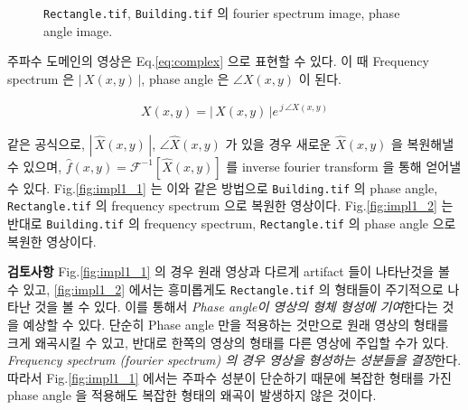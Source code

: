 \documentclass[a4paper, 12p]{paper}
\def\code#1{\texttt{#1}}
\begin{document}
\begin{figure}[H]
{}
\caption{\code{Rectangle.tif}, \code{Building.tif} 의 fourier spectrum image, phase angle image.}\label{fig:impl1_spectrum}
\end{figure}

주파수 도메인의 영상은 Eq.\ref{eq:complex} 으로 표현할 수 있다. 이 때 Frequency spectrum 은 $|\, X(x,y) \, |$, phase angle 은 $\angle{X(x, y)}$ 이 된다.

\begin{align}
  X(x, y) = |\, X(x,y) \, | e^{\, j \, \angle{X(x, y)}}\label{eq:complex}
\end{align}

같은 공식으로, $|\, \hat{X}(x,y) \, |$, $\angle{\hat{X}(x, y)}$ 가 있을 경우 새로운 $\hat{X}(x, y)$ 을 복원해낼 수 있으며, $\hat{f}(x, y) = \mathcal{F}^{-1}[\hat{X}(x, y)]$ 를 inverse fourier transform 을 통해 얻어낼 수 있다. Fig.\ref{fig:impl1_1} 는 이와 같은 방법으로 \code{Building.tif} 의 phase angle, \code{Rectangle.tif} 의 frequency spectrum 으로 복원한 영상이다. Fig.\ref{fig:impl1_2} 는 반대로 \code{Building.tif} 의 frequency spectrum, \code{Rectangle.tif} 의 phase angle 으로 복원한 영상이다.

\textbf{검토사항} Fig.\ref{fig:impl1_1} 의 경우 원래 영상과 다르게 artifact 들이 나타난것을 볼 수 있고, \ref{fig:impl1_2} 에서는 흥미롭게도 \code{Rectangle.tif} 의 형태들이 주기적으로 나타난 것을 볼 수 있다. 이를 통해서 \textit{Phase angle이 영상의 형체 형성에 기여}한다는 것을 예상할 수 있다. 단순히 Phase angle 만을 적용하는 것만으로 원래 영상의 형태를 크게 왜곡시킬 수 있고, 반대로 한쪽의 영상의 형태를 다른 영상에 주입할 수가 있다. \textit{Frequency spectrum (fourier spectrum) 의 경우 영상을 형성하는 성분들을 결정}한다. 따라서 Fig.\ref{fig:impl1_1} 에서는 주파수 성분이 단순하기 때문에 복잡한 형태를 가진 phase angle 을 적용해도 복잡한 형태의 왜곡이 발생하지 않은 것이다.
\end{document}
